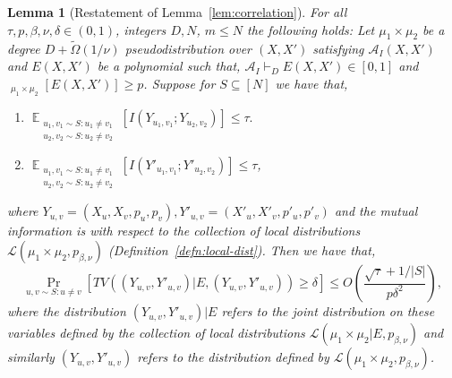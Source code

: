 \documentclass[11pt]{article}
\DeclareMathOperator*{\E}{\mathbb{E}}
\DeclareMathOperator*{\pE}{\widetilde{\mathbb{E}}}
\def \cA {\mathcal{A}}
\def \cL {\mathcal{L}}
\newtheorem{lemma}[theorem]{Lemma}
\theoremstyle{definition}
\begin{document}
\begin{lemma}[Restatement of Lemma~\ref{lem:correlation}]
For all $\tau,p,\beta,\nu,\delta \in (0,1)$, integers $D,N$, $m \leq N$ the following holds: Let $\mu_1 \times \mu_2$ be a degree $D+\widetilde{\Omega}(1/\nu)$ pseudodistribution over $(X,X')$ satisfying $\cA_I(X,X')$ and $E(X,X')$ be a polynomial such that, $\cA_I \vdash_D E(X,X') \in [0,1]$ and $\pE_{\mu_1 \times \mu_2}[E(X,X')] \geq p$. Suppose for $S \subseteq [N]$ we have that, 
\begin{enumerate}
\item $\E_{\substack{u_1,v_1 \sim S: u_1 \neq v_1\\ u_2,v_2 \sim S: u_2 \neq v_2}}[I(Y_{u_1,v_1};Y_{u_2,v_2})] \leq \tau.$
\item $\E_{\substack{u_1,v_1 \sim S: u_1 \neq v_1\\ u_2,v_2 \sim S: u_2 \neq v_2}}[I(Y'_{u_1,v_1};Y'_{u_2,v_2})] \leq \tau$,
\end{enumerate}
where $Y_{u,v} = (X_u,X_v,p_u,p_v), Y'_{u,v} = (X'_u,X'_v,p'_u,p'_v)$ and the mutual information is with respect to the collection of local distributions $\cL(\mu_1 \times \mu_2,p_{\beta,\nu})$ (Definition~\ref{defn:local-dist}). Then we have that, 
\[\Pr_{u,v \sim S: u \neq v}[ TV((Y_{u,v},Y'_{u,v})|E , (Y_{u,v},Y'_{u,v})) \geq \delta] \leq O\left(\frac{\sqrt{\tau}+ 1/|S|}{p\delta^2}\right),\]
where the distribution $(Y_{u,v},Y'_{u,v})|E$ refers to the joint distribution on these variables defined by the collection of local distributions $\cL(\mu_1 \times \mu_2|E, p_{\beta,\nu})$ and similarly $(Y_{u,v},Y'_{u,v})$ refers to the distribution defined by $\cL(\mu_1 \times \mu_2,p_{\beta,\nu})$.
\end{lemma}
\end{document}
